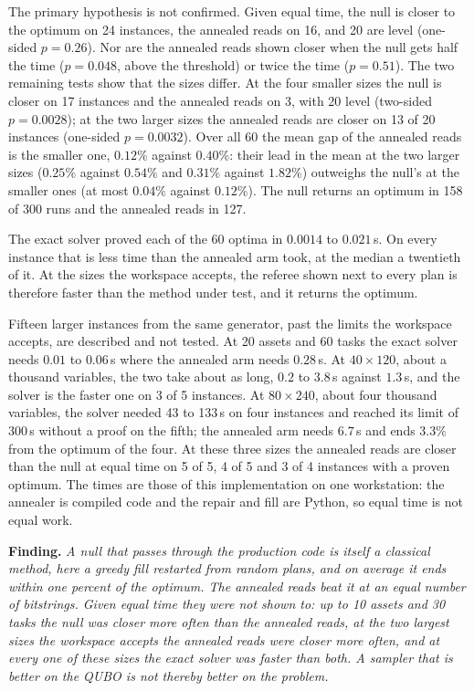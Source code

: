 \documentclass[11pt,a4paper]{article}
\newcommand{\finding}[1]{\par\smallskip\noindent\textbf{Finding.} \emph{#1}\par\smallskip}
\begin{document}
The primary hypothesis is not confirmed. Given equal time, the null is
closer to the optimum on 24 instances, the annealed reads on 16, and 20 are
level (one-sided $p = 0.26$). Nor are the annealed reads shown closer when
the null gets half the time ($p = 0.048$, above the threshold) or twice the
time ($p = 0.51$). The two remaining tests show that the sizes differ. At
the four smaller sizes the null is closer on 17 instances and the annealed
reads on 3, with 20 level (two-sided $p = 0.0028$); at the two larger sizes
the annealed reads are closer on 13 of 20 instances (one-sided
$p = 0.0032$). Over all 60 the mean gap of the annealed reads is the
smaller one, $0.12\%$ against $0.40\%$: their lead in the mean at the two
larger sizes ($0.25\%$ against $0.54\%$ and $0.31\%$ against $1.82\%$)
outweighs the null's at the smaller ones (at most $0.04\%$ against
$0.12\%$). The null returns an optimum in 158 of 300 runs and the annealed
reads in 127.

The exact solver proved each of the 60 optima in $0.0014$ to $0.021$\,s. On
every instance that is less time than the annealed arm took, at the median
a twentieth of it. At the sizes the workspace accepts, the referee shown
next to every plan is therefore faster than the method under test, and it
returns the optimum.

Fifteen larger instances from the same generator, past the limits the
workspace accepts, are described and not tested. At 20 assets and 60 tasks
the exact solver needs $0.01$ to $0.06$\,s where the annealed arm needs
$0.28$\,s. At $40\times120$, about a thousand variables, the two take about
as long, $0.2$ to $3.8$\,s against $1.3$\,s, and the solver is the faster
one on 3 of 5 instances. At $80\times240$, about four thousand variables,
the solver needed 43 to 133\,s on four instances and reached its limit of
300\,s without a proof on the fifth; the annealed arm needs $6.7$\,s and
ends $3.3\%$ from the optimum of the four. At these three sizes the
annealed reads are closer than the null at equal time on 5 of 5, 4 of 5 and
3 of 4 instances with a proven optimum. The times are those of this
implementation on one workstation: the annealer is compiled code and the
repair and fill are Python, so equal time is not equal work.

\finding{A null that passes through the production code is itself a
classical method, here a greedy fill restarted from random plans, and on
average it ends within one percent of the optimum. The annealed reads beat
it at an equal number of bitstrings. Given equal time they were not shown
to: up to 10 assets and 30 tasks the null was closer more often than the
annealed reads, at the two largest sizes the workspace accepts the annealed
reads were closer more often, and at every one of these sizes the exact
solver was faster than both. A sampler
that is better on the QUBO is not thereby better on the problem.}
\end{document}
